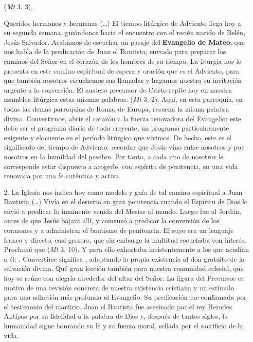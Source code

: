 				\begin{body}
					 (\emph{Mt} 3, 3).
					
					Queridos hermanos y hermanas (\ldots{}) El tiempo litúrgico de Adviento llega hoy a su segunda semana, guiándonos hacia el encuentro con el recién nacido de Belén, Jesús Salvador. Acabamos de escuchar un pasaje del \textbf{Evangelio de Mateo}, que nos habla de la predicación de Juan el Bautista, enviado para preparar los caminos del Señor en el corazón de los hombres de su tiempo. La liturgia nos lo presenta en este camino espiritual de espera y oración que es el Adviento, para que también nosotros escuchemos sus llamadas y hagamos nuestra su invitación urgente a la conversión. El austero precursor de Cristo repite hoy en nuestra asamblea litúrgica estas mismas palabras:  (\emph{Mt} 3, 2). Aquí, en esta parroquia, en todas las demás parroquias de Roma, de Europa, resuena la misma palabra divina. Convertirnos, abrir el corazón a la fuerza renovadora del Evangelio: este debe ser el programa diario de todo creyente, un programa particularmente exigente y elocuente en el período litúrgico que vivimos. De hecho, este es el significado del tiempo de Adviento: recordar que Jesús vino entre nosotros y por nosotros en la humildad del pesebre. Por tanto, a cada uno de nosotros le corresponde estar dispuesto a acogerle, con espíritu de penitencia, en una vida renovada por una fe auténtica y activa.
					
					2. La Iglesia nos indica hoy como modelo y guía de tal camino espiritual a Juan Bautista (\ldots{}) Vivía en el desierto en gran penitencia cuando el Espíritu de Dios lo envió a predicar la inminente venida del Mesías al mundo. Luego fue al Jordán, antes de que Jesús bajara allí, y comenzó a predicar la conversión de los corazones y a administrar el bautismo de penitencia. El suyo era un lenguaje franco y directo, casi grosero, que sin embargo la multitud escuchaba con interés. Proclamó que  (\emph{Mt} 3, 10). Y para ello exhortaba insistentemente a los que acudían a él: . Convertirse significa , adaptando la propia existencia al don gratuito de la salvación divina. Qué gran lección también para nuestra comunidad eclesial, que hoy se reúne con alegría alrededor del altar del Señor. La figura del Precursor es motivo de una revisión concreta de nuestra existencia cristiana y un estímulo para una adhesión más profunda al Evangelio. Su predicación fue confirmada por el testimonio del martirio. Juan el Bautista fue asesinado por el rey Herodes Antipas por su fidelidad a la palabra de Dios y, después de tantos siglos, la humanidad sigue honrando su fe y su fuerza moral, sellada por el sacrificio de la vida.
					

\end{body}
